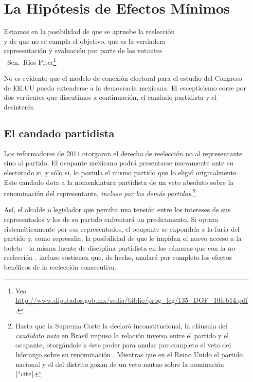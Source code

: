 \documentclass[letter,12pt]{article}
\begin{document}
\section{La Hipótesis de Efectos Mínimos}

\begin{center}
\begin{singlespacing}
  Estamos en la posibilidad de que se apruebe la reelección\\
  y de que no se cumpla el objetivo, que es la verdadera\\
  representación y evaluación por parte de los votantes\\
  --Sen.\ Ríos Piter\footnote{Vea \url{http://www.diputados.gob.mx/sedia/biblio/prog_leg/135_DOF_10feb14.pdf}.}
\end{singlespacing}
\end{center}

\noindent No es evidente que el modelo de conexión electoral para el estudio del Congreso de EE.UU pueda extenderse a la democracia mexicana. El escepticismo corre por dos vertientes que discutimos a continuación, el candado partidista y el desinterés.

\subsection{El candado partidista}

\noindent Los reformadores de 2014 otorgaron el derecho de reelección no al representante sino al partido. El ocupante mexicano podrá presentarse nuevamente ante su electorado si, y sólo si, lo postula el mismo partido que lo eligió originalmente. Este candado dota a la nomenklatura partidista de un veto absoluto sobre la renominación del representante, \emph{incluso por los demás partidos}.\footnote{Hasta que la Suprema Corte la declaró inconstitucional, la cláusula del \emph{candidato nato} en Brasil impuso la relación inversa entre el partido y el ocupante, otorgándole a éste poder para anular por completo el veto del liderazgo sobre su renominación \citep{mainwaring.1991}. Mientras que en el Reino Unido el partido nacional y el del distrito gozan de un veto mutuo sobre la nominación [*cite].}

Así, el alcalde o legislador que perciba una tensión entre los intereses de sus representados y los de su partido enfrentará un predicamento. Si optara sistemáticamente por sus representados, el ocupante se expondría a la furia del partido y, como represalia, la posibilidad de que le impidan el nuevo acceso a la boleta---la misma fuente de disciplina partidista en las cámaras que con la no reelección \citep{weldon.1997esp}. \citet{merinoFierroZarkin2013Blog} incluso sostienen que, de hecho, anulará por completo los efectos benéficos de la reelección consecutiva. 
\end{document}

